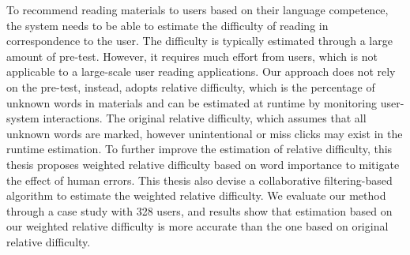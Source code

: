 To recommend reading materials to users based on their language competence, the system needs to be able to estimate the difficulty of reading in correspondence to the user. The difficulty is typically estimated through a large amount of pre-test. However, it requires much effort from users, which is not applicable to a large-scale user reading applications. Our approach does not rely on the pre-test, instead, adopts relative difficulty, which is the percentage of unknown words in materials and can be estimated at runtime by monitoring user-system interactions. The original relative difficulty, which assumes that all unknown words are marked, however unintentional or miss clicks may exist in the runtime estimation. To further improve the estimation of relative difficulty, this thesis proposes weighted relative difficulty based on word importance to mitigate the effect of human errors. This thesis also devise a collaborative filtering-based algorithm to estimate the weighted relative difficulty. We evaluate our method through a case study with 328 users, and results show that estimation based on our weighted relative difficulty is more accurate than the one based on original relative difficulty.